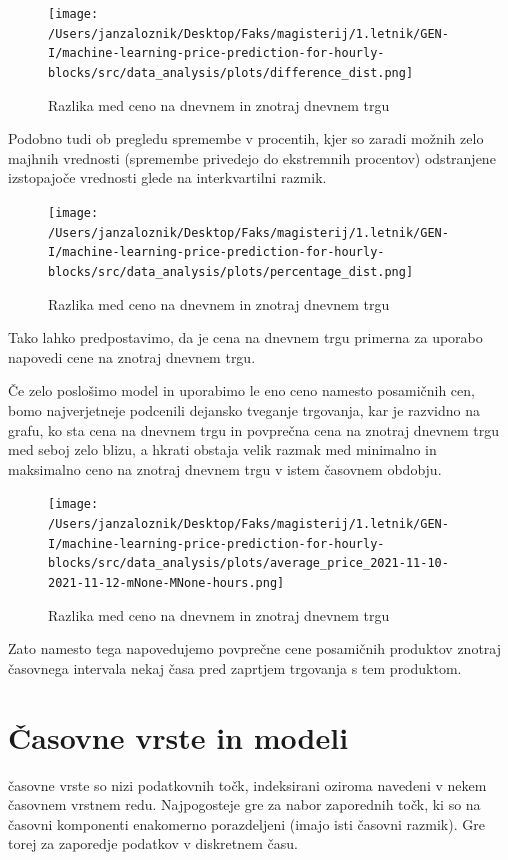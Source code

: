 \documentclass[12pt,a4paper]{amsart}
\theoremstyle{definition} %
\theoremstyle{plain} %
\begin{document}
\begin{figure}[h]
    \centering
    \texttt{[image: /Users/janzaloznik/Desktop/Faks/magisterij/1.letnik/GEN-I/machine-learning-price-prediction-for-hourly-blocks/src/data\_analysis/plots/difference\_dist.png]}
    \caption{Razlika med ceno na dnevnem in znotraj dnevnem trgu}
    \label{fig:Razlika}
\end{figure}

Podobno tudi ob pregledu spremembe v procentih, kjer so zaradi možnih zelo majhnih vrednosti (spremembe privedejo do ekstremnih procentov) odstranjene izstopajoče vrednosti glede na interkvartilni razmik.

\begin{figure}[h]
    \centering
    \texttt{[image: /Users/janzaloznik/Desktop/Faks/magisterij/1.letnik/GEN-I/machine-learning-price-prediction-for-hourly-blocks/src/data\_analysis/plots/percentage\_dist.png]}
    \caption{Razlika med ceno na dnevnem in znotraj dnevnem trgu}
    \label{fig:Razlika}
\end{figure}

Tako lahko predpostavimo, da je cena na dnevnem trgu primerna za uporabo napovedi cene na znotraj dnevnem trgu.

Če zelo poslošimo model in uporabimo le eno ceno namesto posamičnih cen, bomo najverjetneje podcenili dejansko tveganje trgovanja, kar je razvidno na grafu, ko sta cena na dnevnem trgu in povprečna cena na znotraj dnevnem trgu med seboj zelo blizu, a hkrati obstaja velik razmak med minimalno in maksimalno ceno na znotraj dnevnem trgu v istem časovnem obdobju.

\begin{figure}[h]
    \centering
    \texttt{[image: /Users/janzaloznik/Desktop/Faks/magisterij/1.letnik/GEN-I/machine-learning-price-prediction-for-hourly-blocks/src/data\_analysis/plots/average\_price\_2021-11-10-2021-11-12-mNone-MNone-hours.png]}
    \caption{Razlika med ceno na dnevnem in znotraj dnevnem trgu}
    \label{fig:Razlika}
\end{figure}

Zato namesto tega napovedujemo povprečne cene posamičnih produktov znotraj časovnega intervala nekaj časa pred zaprtjem trgovanja s tem produktom.


\section{Časovne vrste in modeli}

časovne vrste so nizi podatkovnih točk, indeksirani oziroma navedeni v nekem časovnem vrstnem redu. 
Najpogosteje gre za nabor zaporednih točk, ki so na časovni komponenti enakomerno porazdeljeni (imajo isti časovni razmik). Gre torej za zaporedje podatkov v diskretnem času.
\end{document}
